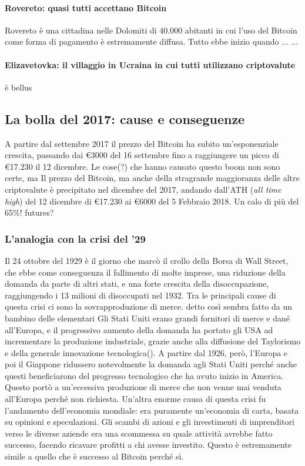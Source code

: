 \documentclass {article}
\begin{document}
\paragraph {Rovereto: quasi tutti accettano Bitcoin}

Rovereto è una cittadina nelle Dolomiti di 40.000 abitanti in cui l'uso del Bitcoin come forma di pagamento è estremamente diffusa.
Tutto ebbe inizio  quando ... ...
\cite{rovereto}


\paragraph {Elizavetovka: il villaggio in Ucraina in cui tutti utilizzano criptovalute}


è bellus \cite{elizavetovka}


\subsection {La bolla del 2017: cause e conseguenze}


A partire dal settembre 2017 il prezzo del Bitcoin ha subito un'esponenziale crescita, passando dai \euro{3000} del 16 settembre fino a raggiungere un picco di \euro{17.230} il 12 dicembre.
Le cose(?) che hanno causato questo boom non sono certe, ma
Il prezzo del Bitcoin, ma anche della stragrande maggioranza delle altre criptovalute è precipitato nel dicembre del 2017, andando dall'ATH (\textit{all time high}) del 12 dicembre di \euro{17.230} ai \euro{6000} del 5 Febbraio 2018. Un calo di più del 65\%!
futures?


\subsubsection {L'analogia con la crisi del '29}


Il 24 ottobre del 1929 è il giorno che marcò il crollo della Borsa di Wall Street, che ebbe come conseguenza il fallimento di molte imprese, una riduzione della domanda da parte di altri stati, e una forte crescita della disoccupazione, raggiungendo i 13 milioni di disoccupati nel 1932.
Tra le principali cause di questa crisi ci sono la sovrapproduzione di merce. detto così sembra fatto da un bambino delle elementari
Gli Stati Uniti erano grandi fornitori di merce e dané all'Europa, e il progressivo aumento della domanda ha portato gli USA ad incrementare la produzione industriale, grazie anche alla diffusione del Taylorismo e della generale innovazione tecnologica().
A partire dal 1926, però, l'Europa e poi il Giappone ridussero notevolmente la domanda agli Stati Uniti perché anche questi beneficiarono del progresso tecnologico che ha avuto inizio in America.
Questo portò a un'eccessiva produzione di merce che non venne mai venduta all'Europa perché non richiesta.
Un'altra enorme causa di questa crisi fu l'andamento dell'economia mondiale: era puramente un'economia di carta, basata su opinioni e speculazioni.
Gli scambi di azioni e gli investimenti di imprenditori verso le diverse aziende era una scommessa su quale attività avrebbe fatto successo, facendo ricavare profitti a chi avesse investito. \cite{crisi29}
Questo è estremamente simile a quello che è successo al Bitcoin perché sì.
\end{document}
